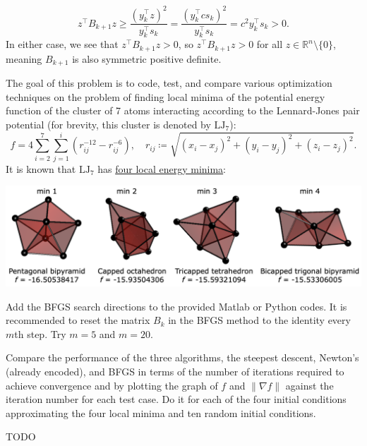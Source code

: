 \documentclass{../kin_math}
\begin{document}
\begin{questions}
\begin{enumerate}
\begin{solution}
      \begin{equation*}
        z^\top B_{k + 1} z \geq \frac{(y_k^\top z)^2}{y_k^\top s_k} = \frac{(y_k^\top c s_k)^2}{y_k^\top s_k} = c^2 y_k^\top s_k > 0.
      \end{equation*}
      In either case, we see that $z^\top B_{k + 1} z > 0$, so $z^\top B_{k + 1} z > 0$ for all $z \in \mathbb{R}^n \setminus \{0\}$, meaning $B_{k + 1}$ is also symmetric positive definite.
    \end{solution}
  \end{enumerate}

  \question The goal of this problem is to code, test, and compare various optimization techniques on the problem of finding local minima of the potential energy function of the cluster of 7 atoms interacting according to the Lennard-Jones pair potential (for brevity, this cluster is denoted by $\text{LJ}_7$):
  \begin{equation}
    f = 4 \sum_{i = 2}^7 \sum_{j = 1}^i \left(r_{ij}^{-12} - r_{ij}^{-6}\right), \quad r_{ij} \coloneqq \sqrt{(x_i - x_j)^2 + (y_i - y_j)^2 + (z_i - z_j)^2}.
  \end{equation}
  It is known that $\text{LJ}_7$ has \href{https://doi.org/10.1063/1.475008}{four local energy minima}:
  \begin{center}
    \includegraphics[scale=0.25]{minima.png}
  \end{center}
  Add the BFGS search directions to the provided Matlab or Python codes. It is recommended to reset the matrix $B_k$ in the BFGS method to the identity every $m$th step. Try $m = 5$ and $m = 20$.

  Compare the performance of the three algorithms, the steepest descent, Newton's (already encoded), and BFGS in terms of the number of iterations required to achieve convergence and by plotting the graph of $f$ and $\lVert \nabla f \rVert$ against the iteration number for each test case. Do it for each of the four initial conditions approximating the four local minima and ten random initial conditions.
  \begin{solution}
    TODO
  \end{solution}


\end{questions}
\end{document}
